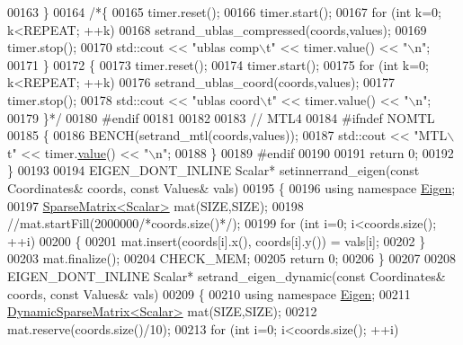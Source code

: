 \begin{DoxyCode}
00163     \}
00164     \textcolor{comment}{/*\{}
00165 \textcolor{comment}{      timer.reset();}
00166 \textcolor{comment}{      timer.start();}
00167 \textcolor{comment}{      for (int k=0; k<REPEAT; ++k)}
00168 \textcolor{comment}{        setrand\_ublas\_compressed(coords,values);}
00169 \textcolor{comment}{      timer.stop();}
00170 \textcolor{comment}{      std::cout << "ublas comp\(\backslash\)t" << timer.value() << "\(\backslash\)n";}
00171 \textcolor{comment}{    \}}
00172 \textcolor{comment}{    \{}
00173 \textcolor{comment}{      timer.reset();}
00174 \textcolor{comment}{      timer.start();}
00175 \textcolor{comment}{      for (int k=0; k<REPEAT; ++k)}
00176 \textcolor{comment}{        setrand\_ublas\_coord(coords,values);}
00177 \textcolor{comment}{      timer.stop();}
00178 \textcolor{comment}{      std::cout << "ublas coord\(\backslash\)t" << timer.value() << "\(\backslash\)n";}
00179 \textcolor{comment}{    \}*/}
00180 \textcolor{preprocessor}{    #endif}
00181 
00182 
00183     \textcolor{comment}{// MTL4}
00184 \textcolor{preprocessor}{    #ifndef NOMTL}
00185     \{
00186       BENCH(setrand\_mtl(coords,values));
00187       std::cout << \textcolor{stringliteral}{"MTL\(\backslash\)t"} << timer.\hyperlink{class_eigen_1_1_bench_timer_a26760f963ed8b64c126159bfea57735e}{value}() << \textcolor{stringliteral}{"\(\backslash\)n"};
00188     \}
00189 \textcolor{preprocessor}{    #endif}
00190 
00191   \textcolor{keywordflow}{return} 0;
00192 \}
00193 
00194 EIGEN\_DONT\_INLINE Scalar* setinnerrand\_eigen(\textcolor{keyword}{const} Coordinates& coords, \textcolor{keyword}{const} Values& vals)
00195 \{
00196   \textcolor{keyword}{using namespace }\hyperlink{namespace_eigen}{Eigen};
00197   \hyperlink{group___sparse_core___module}{SparseMatrix<Scalar>} mat(SIZE,SIZE);
00198   \textcolor{comment}{//mat.startFill(2000000/*coords.size()*/);}
00199   \textcolor{keywordflow}{for} (\textcolor{keywordtype}{int} i=0; i<coords.size(); ++i)
00200   \{
00201     mat.insert(coords[i].x(), coords[i].y()) = vals[i];
00202   \}
00203   mat.finalize();
00204   CHECK\_MEM;
00205   \textcolor{keywordflow}{return} 0;
00206 \}
00207 
00208 EIGEN\_DONT\_INLINE Scalar* setrand\_eigen\_dynamic(\textcolor{keyword}{const} Coordinates& coords, \textcolor{keyword}{const} Values& vals)
00209 \{
00210   \textcolor{keyword}{using namespace }\hyperlink{namespace_eigen}{Eigen};
00211   \hyperlink{class_eigen_1_1_dynamic_sparse_matrix}{DynamicSparseMatrix<Scalar>} mat(SIZE,SIZE);
00212   mat.reserve(coords.size()/10);
00213   \textcolor{keywordflow}{for} (\textcolor{keywordtype}{int} i=0; i<coords.size(); ++i)

\end{DoxyCode}
